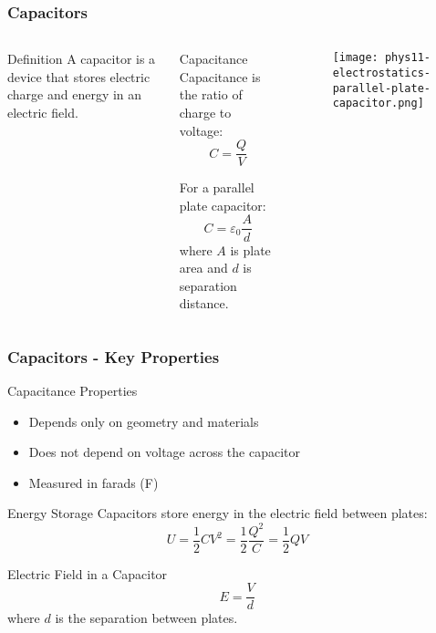 \documentclass{beamer}
\begin{document}
\begin{frame}
    \frametitle{Capacitors}
    \begin{columns}
        \begin{block}{Definition}
            A capacitor is a device that stores electric charge and energy in an electric field.
        \end{block}
        
        \begin{block}{Capacitance}
            Capacitance is the ratio of charge to voltage:
            \begin{equation}
                C = \frac{Q}{V}
            \end{equation}
            
            For a parallel plate capacitor:
            \begin{equation}
                C = \varepsilon_0 \frac{A}{d}
            \end{equation}
            where $A$ is plate area and $d$ is separation distance.
        \end{block}
        
        \begin{alertblock}{ }
            \begin{figure}
                \centering
                \texttt{[image: phys11-electrostatics-parallel-plate-capacitor.png]}
            \end{figure}
        \end{alertblock}
    \end{columns}
\end{frame}

\begin{frame}
    \frametitle{Capacitors - Key Properties}
    \begin{block}{Capacitance Properties}
        \begin{itemize}
            \item Depends only on geometry and materials
            \item Does not depend on voltage across the capacitor
            \item Measured in farads (F)
        \end{itemize}
    \end{block}
    
    \begin{block}{Energy Storage}
        Capacitors store energy in the electric field between plates:
        \begin{equation}
            U = \frac{1}{2}CV^2 = \frac{1}{2}\frac{Q^2}{C} = \frac{1}{2}QV
        \end{equation}
    \end{block}
    
    \begin{block}{Electric Field in a Capacitor}
        \begin{equation}
            E = \frac{V}{d}
        \end{equation}
        where $d$ is the separation between plates.
    \end{block}
\end{frame}
\end{document}
